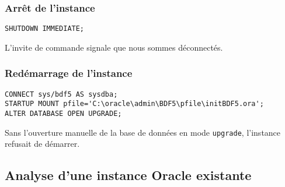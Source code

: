 \subsubsection{Arrêt de l’instance}

\begin{verbatim}
SHUTDOWN IMMEDIATE;
\end{verbatim}

L’invite de commande signale que nous sommes déconnectés.

\subsubsection{Redémarrage de l’instance}

\begin{verbatim}
CONNECT sys/bdf5 AS sysdba;
STARTUP MOUNT pfile='C:\oracle\admin\BDF5\pfile\initBDF5.ora';
ALTER DATABASE OPEN UPGRADE;
\end{verbatim}

Sans l’ouverture manuelle de la base de données en mode
\texttt{upgrade}, l’instance refusait de démarrer.

\subsection{Analyse d’une instance Oracle existante}
